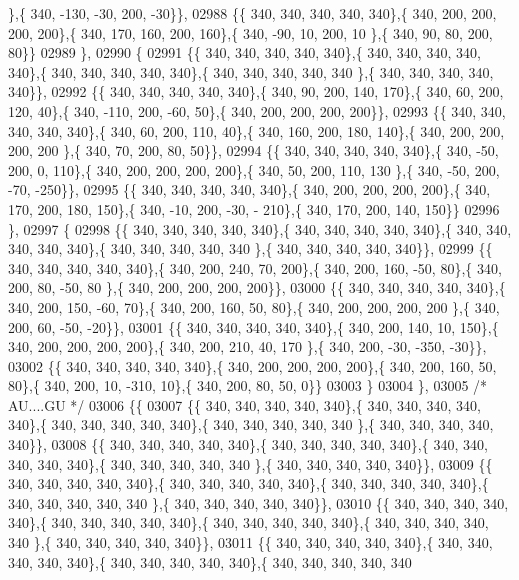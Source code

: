 \begin{DoxyCode}
      \},\{ 340, -130, -30, 200, -30\}\},
02988 \{\{ 340, 340, 340, 340, 340\},\{ 340, 200, 200, 200, 200\},\{ 340, 170, 160, 200, 160\},\{ 340, -90,  10, 200,  10
      \},\{ 340,  90,  80, 200,  80\}\}
02989 \},
02990 \{
02991 \{\{ 340, 340, 340, 340, 340\},\{ 340, 340, 340, 340, 340\},\{ 340, 340, 340, 340, 340\},\{ 340, 340, 340, 340, 340
      \},\{ 340, 340, 340, 340, 340\}\},
02992 \{\{ 340, 340, 340, 340, 340\},\{ 340,  90, 200, 140, 170\},\{ 340,  60, 200, 120,  40\},\{ 340, -110, 200, -60,  
      50\},\{ 340, 200, 200, 200, 200\}\},
02993 \{\{ 340, 340, 340, 340, 340\},\{ 340,  60, 200, 110,  40\},\{ 340, 160, 200, 180, 140\},\{ 340, 200, 200, 200, 200
      \},\{ 340,  70, 200,  80,  50\}\},
02994 \{\{ 340, 340, 340, 340, 340\},\{ 340, -50, 200,   0, 110\},\{ 340, 200, 200, 200, 200\},\{ 340,  50, 200, 110, 130
      \},\{ 340, -50, 200, -70, -250\}\},
02995 \{\{ 340, 340, 340, 340, 340\},\{ 340, 200, 200, 200, 200\},\{ 340, 170, 200, 180, 150\},\{ 340, -10, 200, -30, -
      210\},\{ 340, 170, 200, 140, 150\}\}
02996 \},
02997 \{
02998 \{\{ 340, 340, 340, 340, 340\},\{ 340, 340, 340, 340, 340\},\{ 340, 340, 340, 340, 340\},\{ 340, 340, 340, 340, 340
      \},\{ 340, 340, 340, 340, 340\}\},
02999 \{\{ 340, 340, 340, 340, 340\},\{ 340, 200, 240,  70, 200\},\{ 340, 200, 160, -50,  80\},\{ 340, 200,  80, -50,  80
      \},\{ 340, 200, 200, 200, 200\}\},
03000 \{\{ 340, 340, 340, 340, 340\},\{ 340, 200, 150, -60,  70\},\{ 340, 200, 160,  50,  80\},\{ 340, 200, 200, 200, 200
      \},\{ 340, 200,  60, -50, -20\}\},
03001 \{\{ 340, 340, 340, 340, 340\},\{ 340, 200, 140,  10, 150\},\{ 340, 200, 200, 200, 200\},\{ 340, 200, 210,  40, 170
      \},\{ 340, 200, -30, -350, -30\}\},
03002 \{\{ 340, 340, 340, 340, 340\},\{ 340, 200, 200, 200, 200\},\{ 340, 200, 160,  50,  80\},\{ 340, 200,  10, -310,  
      10\},\{ 340, 200,  80,  50,   0\}\}
03003 \}
03004 \},
03005 \textcolor{comment}{/* AU....GU */}
03006 \{\{
03007 \{\{ 340, 340, 340, 340, 340\},\{ 340, 340, 340, 340, 340\},\{ 340, 340, 340, 340, 340\},\{ 340, 340, 340, 340, 340
      \},\{ 340, 340, 340, 340, 340\}\},
03008 \{\{ 340, 340, 340, 340, 340\},\{ 340, 340, 340, 340, 340\},\{ 340, 340, 340, 340, 340\},\{ 340, 340, 340, 340, 340
      \},\{ 340, 340, 340, 340, 340\}\},
03009 \{\{ 340, 340, 340, 340, 340\},\{ 340, 340, 340, 340, 340\},\{ 340, 340, 340, 340, 340\},\{ 340, 340, 340, 340, 340
      \},\{ 340, 340, 340, 340, 340\}\},
03010 \{\{ 340, 340, 340, 340, 340\},\{ 340, 340, 340, 340, 340\},\{ 340, 340, 340, 340, 340\},\{ 340, 340, 340, 340, 340
      \},\{ 340, 340, 340, 340, 340\}\},
03011 \{\{ 340, 340, 340, 340, 340\},\{ 340, 340, 340, 340, 340\},\{ 340, 340, 340, 340, 340\},\{ 340, 340, 340, 340, 340

\end{DoxyCode}
